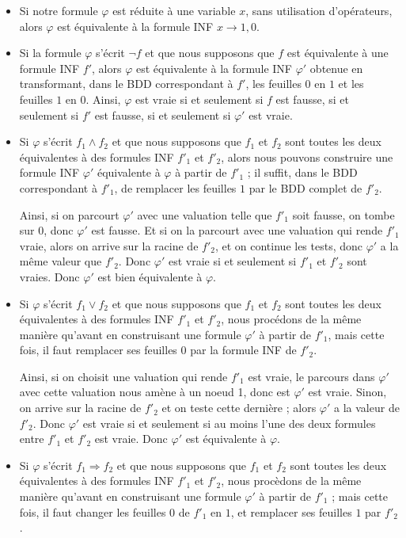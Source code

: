 \documentclass[a4paper,11pt]{article}
\begin{document}
		\begin{itemize}
		\item Si notre formule $\varphi$ est réduite à une variable $x$, sans utilisation d'opérateurs, alors $\varphi$ est équivalente à la formule INF $x \rightarrow 1,0$.
		\item Si la formule $\varphi$ s'écrit $\neg f$ et que nous supposons que $f$ est équivalente à une formule INF $f'$, alors $\varphi$ est équivalente à la formule INF $\varphi'$ obtenue en transformant, dans le BDD correspondant à $f'$, les feuilles $0$ en $1$ et les feuilles $1$ en $0$. Ainsi, $\varphi$ est vraie si et seulement si $f$ est fausse, si et seulement si $f'$ est fausse, si et seulement si $\varphi'$ est vraie. 
		\item Si $\varphi$ s'écrit $f_1 \wedge f_2$ et que nous supposons que $f_1$ et $f_2$ sont toutes les deux équivalentes à des formules INF ${f'}_1$ et ${f'}_2$, alors nous pouvons construire une formule INF $\varphi'$ équivalente à $\varphi$ à partir de ${f'}_1$ ; il suffit, dans le BDD correspondant à ${f'}_1$, de remplacer les feuilles $1$ par le BDD complet de ${f'}_2$.
		
		Ainsi, si on parcourt $\varphi'$ avec une valuation telle que ${f'}_1$ soit fausse, on tombe sur $0$, donc $\varphi'$ est fausse. Et si on la parcourt avec une valuation qui rende ${f'}_1$ vraie, alors on arrive sur la racine de ${f'}_2$, et on continue les tests, donc $\varphi'$ a la même valeur que ${f'}_2$. Donc $\varphi'$ est vraie si et seulement si ${f'}_1$ et ${f'}_2$ sont vraies. Donc $\varphi'$ est bien équivalente à $\varphi$.
		\item Si $\varphi$ s'écrit $f_1 \vee f_2$ et que nous supposons que $f_1$ et $f_2$ sont toutes les deux équivalentes à des formules INF ${f'}_1$ et ${f'}_2$, nous procédons de la même manière qu'avant en construisant une formule $\varphi'$ à partir de ${f'}_1$, mais cette fois, il faut remplacer ses feuilles $0$ par la formule INF de ${f'}_2$.
		
		Ainsi, si on choisit une valuation qui rende ${f'}_1$ est vraie, le parcours dans $\varphi'$ avec cette valuation nous amène à un noeud 1, donc est $\varphi'$ est vraie. Sinon, on arrive sur la racine de ${f'}_2$ et on teste cette dernière ; alors $\varphi'$ a la valeur de ${f'}_2$. Donc $\varphi'$ est vraie si et seulement si au moins l'une des deux formules entre ${f'}_1$ et ${f'}_2$ est vraie.
		Donc $\varphi'$ est équivalente à $\varphi$.
		\item Si $\varphi$ s'écrit $f_1 \Rightarrow f_2$ et que nous supposons que $f_1$ et $f_2$ sont toutes les deux équivalentes à des formules INF ${f'}_1$ et ${f'}_2$, nous procèdons de la même manière qu'avant en construisant une formule $\varphi'$ à partir de ${f'}_1$ ; mais cette fois, il faut changer les feuilles $0$ de ${f'}_1$ en $1$, et remplacer ses feuilles $1$ par ${f'}_2$.
		

\end{itemize}
\end{document}
